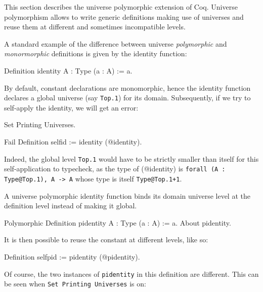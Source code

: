 
\label{Universes-full}


This section describes the universe polymorphic extension of Coq.
Universe polymorphism allows to write generic definitions making use of
universes and reuse them at different and sometimes incompatible levels.

A standard example of the difference between universe \emph{polymorphic} and 
\emph{monormorphic} definitions is given by the identity function:

\begin{coq_example*}
Definition identity {A : Type} (a : A) := a.
\end{coq_example*}

By default, constant declarations are monomorphic, hence the identity
function declares a global universe (say \texttt{Top.1}) for its
domain. Subsequently, if we try to self-apply the identity, we will get
an error:

\begin{coq_eval}
Set Printing Universes.
\end{coq_eval}
\begin{coq_example}
Fail Definition selfid := identity (@identity).
\end{coq_example}

Indeed, the global level \texttt{Top.1} would have to be strictly smaller than itself
for this self-application to typecheck, as the type of (@identity) is
\texttt{forall (A : Type@{Top.1}), A -> A} whose type is itself \texttt{Type@{Top.1+1}}.

A universe polymorphic identity function binds its domain universe level
at the definition level instead of making it global.

\begin{coq_example}
Polymorphic Definition pidentity {A : Type} (a : A) := a.
About pidentity.
\end{coq_example}

It is then possible to reuse the constant at different levels, like so:

\begin{coq_example}
Definition selfpid := pidentity (@pidentity).
\end{coq_example}

Of course, the two instances of \texttt{pidentity} in this definition
are different. This can be seen when \texttt{Set Printing Universes} is
on:

